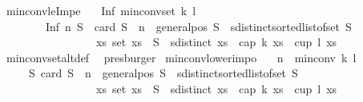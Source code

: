 \begin{isabellebody}
\endisatagproof
{\isafoldproof}%
%
\isadelimproof
\isanewline
%
\endisadelimproof
\isanewline
{}\isamarkupfalse%
\ min{\isacharunderscore}{\kern0pt}conv{\isacharunderscore}{\kern0pt}leImpe{\isacharcolon}{\kern0pt}\isanewline
\ \ \ {\isachardoublequoteopen}Inf\ {\isacharparenleft}{\kern0pt}min{\isacharunderscore}{\kern0pt}conv{\isacharunderscore}{\kern0pt}set\ k\ l{\isacharparenright}{\kern0pt}\isanewline
\ \ \ \ \ \ \ \ {\isacharequal}{\kern0pt}\isanewline
\ \ \ \ \ \ \ \ Inf\ {\isacharbraceleft}{\kern0pt}n{\isachardot}{\kern0pt}\ {\isasymforall}S\ {\isachardot}{\kern0pt}\ {\isacharparenleft}{\kern0pt}card\ S\ {\isacharequal}{\kern0pt}\ n\ {\isasymand}\ general{\isacharunderscore}{\kern0pt}pos\ S\ {\isasymand}\ sdistinct{\isacharparenleft}{\kern0pt}sorted{\isacharunderscore}{\kern0pt}list{\isacharunderscore}{\kern0pt}of{\isacharunderscore}{\kern0pt}set\ S{\isacharparenright}{\kern0pt}{\isacharparenright}{\kern0pt}\isanewline
\ \ \ \ \ \ \ \ \ \ \ \ \ \ \ \ {\isasymlongrightarrow}\ {\isacharparenleft}{\kern0pt}{\isasymexists}xs{\isachardot}{\kern0pt}\ set\ xs\ {\isasymsubseteq}\ S\ {\isasymand}\ sdistinct\ xs\ {\isasymand}\ {\isacharparenleft}{\kern0pt}cap\ k\ xs\ {\isasymor}\ cup\ l\ xs{\isacharparenright}{\kern0pt}{\isacharparenright}{\kern0pt}{\isacharbraceright}{\kern0pt}{\isachardoublequoteclose}\isanewline
%
\isadelimproof
\ \ %
\endisadelimproof
%
\isatagproof
{}\isamarkupfalse%
\ min{\isacharunderscore}{\kern0pt}conv{\isacharunderscore}{\kern0pt}set{\isacharunderscore}{\kern0pt}alt{\isacharunderscore}{\kern0pt}def\ \isamarkupfalse%
\ presburger%
\endisatagproof
{\isafoldproof}%
%
\isadelimproof
\isanewline
%
\endisadelimproof
\isanewline
{}\isamarkupfalse%
\ min{\isacharunderscore}{\kern0pt}conv{\isacharunderscore}{\kern0pt}lower{\isacharunderscore}{\kern0pt}imp{}o{\isacharcolon}{\kern0pt}\isanewline
\ \ \ {\isachardoublequoteopen}n\ {\isacharless}{\kern0pt}\ min{\isacharunderscore}{\kern0pt}conv\ k\ l{\isachardoublequoteclose}\isanewline
\ \ \ \ \ {\isachardoublequoteopen}{\isasymexists}S{\isachardot}{\kern0pt}\ {\isacharparenleft}{\kern0pt}card\ S\ {\isacharequal}{\kern0pt}\ n\ {\isasymand}\ general{\isacharunderscore}{\kern0pt}pos\ S\ {\isasymand}\ sdistinct{\isacharparenleft}{\kern0pt}sorted{\isacharunderscore}{\kern0pt}list{\isacharunderscore}{\kern0pt}of{\isacharunderscore}{\kern0pt}set\ S{\isacharparenright}{\kern0pt}{\isacharparenright}{\kern0pt}\isanewline
\ \ \ \ \ \ \ \ \ \ \ \ \ \ \ \ {\isasymand}\ {\isacharparenleft}{\kern0pt}{\isasymforall}xs{\isachardot}{\kern0pt}\ set\ xs\ {\isasymsubseteq}\ S\ {\isasymand}\ sdistinct\ xs\ {\isasymlongrightarrow}\ {\isasymnot}{\isacharparenleft}{\kern0pt}cap\ k\ xs\ {\isasymor}\ cup\ l\ xs{\isacharparenright}{\kern0pt}{\isacharparenright}{\kern0pt}{\isachardoublequoteclose}\isanewline

\end{isabellebody}
